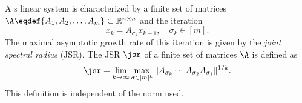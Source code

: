 A s\witch{} linear system is characterized by a finite set of matrices $\A \eqdef \{A_1, A_2,\ldots, A_m\} \subset \mathbb{R}^{n \times n}$ and the iteration
\begin{equation}
  \label{eq:switchsys}
  x_k = A_{\sigma_k} x_{k-1}, \quad \sigma_k \in [m].
\end{equation}
The maximal asymptotic growth rate of this iteration is given by the \emph{joint spectral radius} (JSR).
The JSR $\jsr$ of a finite set of matrices $\A$
is defined as
\[ \jsr = \lim_{k \to \infty} \max_{\sigma \in [m]^k} \|A_{\sigma_k} \cdots A_{\sigma_2} A_{\sigma_1}\|^{1/k}. \]
This definition is independent of the norm used.
